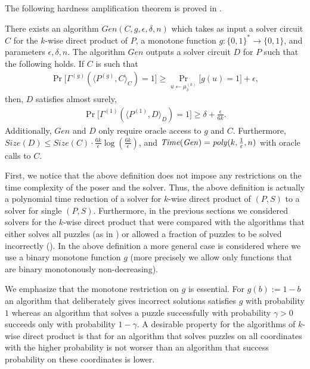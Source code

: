 The following hardness amplification theorem is proved in \cite{DBLP:journals/corr/abs-1002-3534}.
\begin{theorem}
There exists an algorithm $\mathit{Gen}(C,g,\epsilon, \delta, n)$ which takes as input a solver circuit $C$ for the $k$-wise
direct product of $P$, a monotone function $g: \{0,1\}^{*} \rightarrow \{0,1\}$, and parameters $\epsilon,\delta,n$.
The algorithm $\mathit{Gen}$ outputs a solver circuit $D$ for $P$ such that the following holds.
If $C$ is such that
\begin{align*}
\Pr\Big[\Gamma^{(g)}(\langle P^{(g)}, C \rangle_C) = 1\Big] \geq \Pr_{u \leftarrow \mu_{\delta}^{(k)}} \Big[ g(u) = 1 \Big] + \epsilon,
\end{align*}
then, $D$ satisfies almost surely,
\begin{align*}
  \Pr\Big[ \Gamma^{(1)}(\langle P^{(1)}, D\rangle_{D}) = 1\Big] \geq \delta + \frac{\epsilon}{6k}.
\end{align*}
Additionally, $\mathit{Gen}$ and $D$ only require oracle access to $g$ and $C$.
Furthermore, $\mathit{Size}(D) \leq \mathit{Size}(C) \cdot \frac{6k}{\epsilon} \log(\frac{6k}{\epsilon})$,
and $\operatorname{\mathit{Time}} (\mathit{Gen}) = \operatorname{\mathit{poly}}(k, \frac{1}{\varepsilon}, n)$ with oracle calls to $C$.
\end{theorem}

First, we notice that the above definition does not impose any restrictions on the time complexity of the poser and the solver.
Thus, the above definition is actually a polynomial time reduction of a solver for $k$-wise direct product of $(P,S)$ to
a solver for single $(P,S)$.
Furthermore, in the previous sections we considered solvers for the $k$-wise direct product that were compared with the algorithms that either
solves all puzzles (as in \cite{canetti2004hardness}) or allowed a fraction of puzzles to be solved incorrectly (\cite{Dodis:2009:SAI:1530441.1530450}).
In the above definition a more general case is considered where we use a binary monotone function $g$
(more precisely we allow only functions that are binary monotonously non-decreasing).

We emphasize that the monotone restriction on $g$ is essential. For $g(b) := 1 - b$ an algorithm that
deliberately gives incorrect solutions satisfies $g$ with probability $1$ whereas an algorithm that solves a puzzle successfully with probability
$\gamma > 0$ succeeds only with probability $1 - \gamma$.
A desirable property for the algorithms of $k$-wise direct product
is that for an algorithm that solves puzzles on all coordinates with the higher probability
is not worser than an algorithm that success probability on these coordinates is lower.

